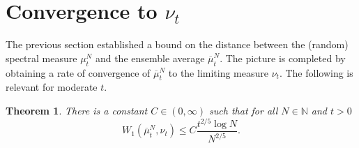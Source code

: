 \documentclass[11pt]{article}
\newtheorem{thm}[theo]{Theorem}
\theoremstyle{definition}
\numberwithin{equation}{section}
\numberwithin{figure}{section}
\numberwithin{table}{section}
\begin{document}
\section{Convergence to \texorpdfstring{$\nu_t$}{nu t}}\label{s.nut}

The previous section established a bound on the distance between the (random) spectral measure $\mu^N_t$ and the ensemble average $\overline{\mu}^N_t$. The picture is completed by obtaining a rate of convergence of $\overline{\mu}^N_t$ to the limiting measure $\nu_t$. The following is relevant for moderate $t$.

\begin{thm}\label{T:avg-to-limit}
There is a constant $C\in(0,\infty)$ such that for all $N\in\mathbb{N}$ and $t>0$
\[
W_1(\overline{\mu}^N_t,\nu_t) \le C\frac{t^{2/5}\log N}{N^{2/5}}.
\]
\end{thm}
\end{document}
